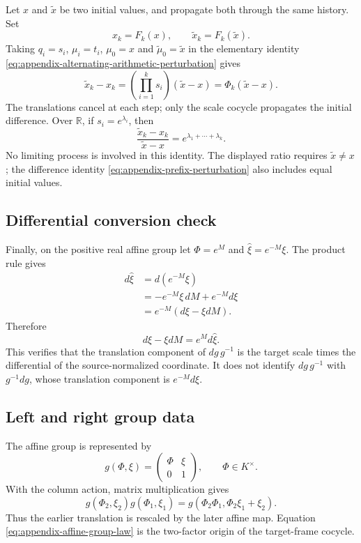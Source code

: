 Let $x$ and $\widetilde x$ be two initial values, and propagate both through
the same history.  Set
\[
  x_k=F_k(x),
  \qquad
  \widetilde x_k=F_k(\widetilde x).
\]
Taking $q_i=s_i$, $\mu_i=t_i$, $\mu_0=x$ and
$\widetilde\mu_0=\widetilde x$ in the elementary identity
\eqref{eq:appendix-alternating-arithmetic-perturbation} gives
\begin{equation}
  \widetilde x_k-x_k
  =\left(\prod_{i=1}^{k}s_i\right)(\widetilde x-x)
  =\Phi_k(\widetilde x-x).
  \label{eq:appendix-prefix-perturbation}
\end{equation}
The translations cancel at each step; only the scale cocycle propagates the
initial difference.  Over $\mathbb R$, if $s_i=e^{\lambda_i}$, then
\[
  \frac{\widetilde x_k-x_k}{\widetilde x-x}
  =e^{\lambda_1+\cdots+\lambda_k}.
\]
No limiting process is involved in this identity.
The displayed ratio requires $\widetilde x\ne x$; the difference identity
\eqref{eq:appendix-prefix-perturbation} also includes equal initial values.

\subsection{Differential conversion check}

Finally, on the positive real affine group let $\Phi=e^M$ and
$\widehat\xi=e^{-M}\xi$.  The product rule gives
\begin{align*}
  d\widehat\xi
  &=d(e^{-M}\xi)\\
  &=-e^{-M}\xi\,dM+e^{-M}d\xi\\
  &=e^{-M}(d\xi-\xi dM).
\end{align*}
Therefore
\[
  d\xi-\xi dM=e^M d\widehat\xi.
\]
This verifies that the translation component of $dg\,g^{-1}$ is the target
scale times the differential of the source-normalized coordinate.  It does
not identify $dg\,g^{-1}$ with $g^{-1}dg$, whose translation component is
$e^{-M}d\xi$.

\subsection{Left and right group data}

The affine group is represented by
\[
  g(\Phi,\xi)=
  \begin{pmatrix}\Phi&\xi\\0&1\end{pmatrix},
  \qquad \Phi\in K^\times.
\]
With the column action, matrix multiplication gives
\begin{equation}
  g(\Phi_2,\xi_2)g(\Phi_1,\xi_1)
  =g(\Phi_2\Phi_1,\Phi_2\xi_1+\xi_2).
  \label{eq:appendix-affine-group-law}
\end{equation}
Thus the earlier translation is rescaled by the later affine map.  Equation
\eqref{eq:appendix-affine-group-law} is the two-factor origin of the
target-frame cocycle.

